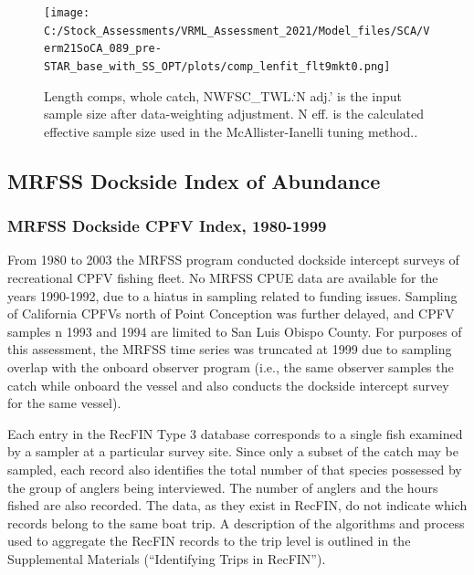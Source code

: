 \documentclass[11pt,
  english,
  a4paper,
]{article}
\begin{document}
\begin{figure}
\centering
\texttt{[image: C:/Stock\_Assessments/VRML\_Assessment\_2021/Model\_files/SCA/Verm21SoCA\_089\_pre-STAR\_base\_with\_SS\_OPT/plots/comp\_lenfit\_flt9mkt0.png]}
\caption{Length comps, whole catch, NWFSC\_TWL.`N adj.' is the input sample size after data-weighting adjustment. N eff. is the calculated effective sample size used in the McAllister-Ianelli tuning method..\label{fig:comp_lenfit_flt9mkt0}}
\end{figure}

\clearpage


\hypertarget{mrfss-index}{%
\subsection{MRFSS Dockside Index of Abundance}\label{mrfss-index}}

\leavevmode\tagmcend\tagstructend


\hypertarget{mrfss-dockside-cpfv-index-1980-1999}{%
\subsubsection{MRFSS Dockside CPFV Index, 1980-1999}\label{mrfss-dockside-cpfv-index-1980-1999}}

\leavevmode\tagmcend\tagstructend

From 1980 to 2003 the MRFSS program conducted dockside intercept surveys of recreational CPFV fishing fleet. No MRFSS CPUE data are available for the years 1990-1992, due to a hiatus in sampling related to funding issues. Sampling of California CPFVs north of Point Conception was further delayed, and CPFV samples n 1993 and 1994 are limited to San Luis Obispo County. For purposes of this assessment, the MRFSS time series was truncated at 1999 due to sampling overlap with the onboard observer program (i.e., the same observer samples the catch while onboard the vessel and also conducts the dockside intercept survey for the same vessel).

Each entry in the RecFIN Type 3 database corresponds to a single fish examined by a sampler at a particular survey site. Since only a subset of the catch may be sampled, each record also identifies the total number of that species possessed by the group of anglers being interviewed. The number of anglers and the hours fished are also recorded. The data, as they exist in RecFIN, do not indicate which records belong to the same boat trip. A description of the algorithms and process used to aggregate the RecFIN records to the trip level is outlined in the Supplemental Materials (``Identifying Trips in RecFIN'').
\end{document}
